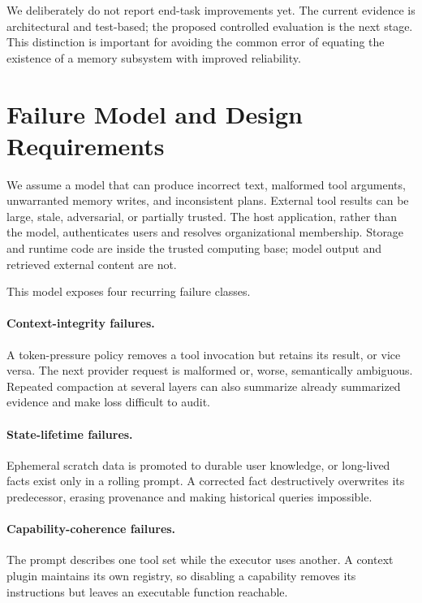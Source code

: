 \documentclass[sigplan,10pt,anonymous,review]{acmart}
\begin{document}
We deliberately do not report end-task improvements yet.  The current evidence
is architectural and test-based; the proposed controlled evaluation is the
next stage.  This distinction is important for avoiding the common error of
equating the existence of a memory subsystem with improved reliability.

\section{Failure Model and Design Requirements}

We assume a model that can produce incorrect text, malformed tool arguments,
unwarranted memory writes, and inconsistent plans.  External tool results can
be large, stale, adversarial, or partially trusted.  The host application,
rather than the model, authenticates users and resolves organizational
membership.  Storage and runtime code are inside the trusted computing base;
model output and retrieved external content are not.

This model exposes four recurring failure classes.

\paragraph{Context-integrity failures.}
A token-pressure policy removes a tool invocation but retains its result, or
vice versa.  The next provider request is malformed or, worse, semantically
ambiguous.  Repeated compaction at several layers can also summarize already
summarized evidence and make loss difficult to audit.

\paragraph{State-lifetime failures.}
Ephemeral scratch data is promoted to durable user knowledge, or long-lived
facts exist only in a rolling prompt.  A corrected fact destructively
overwrites its predecessor, erasing provenance and making historical queries
impossible.

\paragraph{Capability-coherence failures.}
The prompt describes one tool set while the executor uses another.  A context
plugin maintains its own registry, so disabling a capability removes its
instructions but leaves an executable function reachable.
\end{document}
